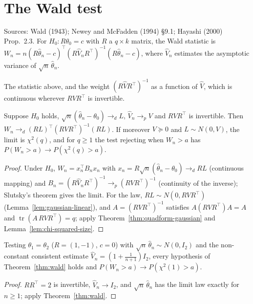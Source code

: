 \section{The Wald test}
\label{sec:wald}

Sources: Wald (1943); Newey and McFadden (1994) \S9.1; Hayashi (2000) Prop.~2.3. For $H_0: R\theta_0 = c$ with $R$ a
$q\times k$ matrix, the Wald statistic is
$W_n = n(R\hat\theta_n-c)^\top(R\hat V_nR^\top)^{-1}(R\hat\theta_n-c)$, where $\hat V_n$ estimates the asymptotic
variance of $\sqrt n\,\hat\theta_n$.

\begin{definition}
\label{def:wald}
\leanok
The statistic above, and the weight $(R\hat VR^\top)^{-1}$ as a function of $\hat V$, which is continuous wherever
$RVR^\top$ is invertible.
\end{definition}

\begin{theorem}
\label{thm:wald}
\leanok
{}
Suppose $H_0$ holds, $\sqrt n(\hat\theta_n-\theta_0)\to_d L$, $\hat V_n\to_p V$ and $RVR^\top$ is invertible. Then
$W_n\to_d(RL)^\top(RVR^\top)^{-1}(RL)$. If moreover $V\succeq0$ and $L\sim N(0,V)$, the limit is $\chi^2(q)$, and for
$q\ge1$ the test rejecting when $W_n > a$ has $P(W_n > a)\to P(\chi^2(q) > a)$.
\end{theorem}
\begin{proof}
\leanok
Under $H_0$, $W_n = x_n^\top B_nx_n$ with $x_n = R\sqrt n(\hat\theta_n-\theta_0)\to_d RL$ (continuous mapping) and
$B_n = (R\hat V_nR^\top)^{-1}\to_p(RVR^\top)^{-1}$ (continuity of the inverse); Slutsky's theorem gives the limit. For the
law, $RL\sim N(0,RVR^\top)$ (Lemma~\ref{lem:gaussian-linear}), and $A = (RVR^\top)^{-1}$ satisfies
$A(RVR^\top)A = A$ and $\operatorname{tr}(A\,RVR^\top) = q$; apply Theorem~\ref{thm:quadform-gaussian} and
Lemma~\ref{lem:chi-squared-size}.
\end{proof}

\begin{theorem}
\label{thm:wald-witness}
\leanok
{}
Testing $\theta_1 = \theta_2$ ($R = (1,-1)$, $c = 0$) with $\sqrt n\,\hat\theta_n\sim N(0,I_2)$ and the
non-constant consistent estimate $\hat V_n = (1+\frac1{n+1})I_2$, every hypothesis of Theorem~\ref{thm:wald} holds
and $P(W_n > a)\to P(\chi^2(1) > a)$.
\end{theorem}
\begin{proof}
\leanok
$RR^\top = 2$ is invertible, $\hat V_n\to I_2$, and $\sqrt n\,\hat\theta_n$ has the limit law exactly for $n\ge1$;
apply Theorem~\ref{thm:wald}.
\end{proof}


